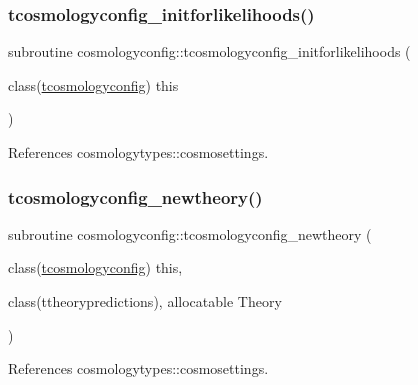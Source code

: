 \subsubsection{\texorpdfstring{tcosmologyconfig\+\_\+initforlikelihoods()}{tcosmologyconfig\_initforlikelihoods()}}
{\footnotesize\ttfamily subroutine cosmologyconfig\+::tcosmologyconfig\+\_\+initforlikelihoods (\begin{DoxyParamCaption}\item[{class(\mbox{\hyperlink{structcosmologyconfig_1_1tcosmologyconfig}{tcosmologyconfig}})}]{this }\end{DoxyParamCaption})\hspace{0.3cm}{\ttfamily [private]}}



References cosmologytypes\+::cosmosettings.

\mbox{\label{namespacecosmologyconfig_a06fe1484d890d220a81bc2f26abb6ee1}} 
\subsubsection{\texorpdfstring{tcosmologyconfig\+\_\+newtheory()}{tcosmologyconfig\_newtheory()}}
{\footnotesize\ttfamily subroutine cosmologyconfig\+::tcosmologyconfig\+\_\+newtheory (\begin{DoxyParamCaption}\item[{class(\mbox{\hyperlink{structcosmologyconfig_1_1tcosmologyconfig}{tcosmologyconfig}})}]{this,  }\item[{class(ttheorypredictions), allocatable}]{Theory }\end{DoxyParamCaption})\hspace{0.3cm}{\ttfamily [private]}}



References cosmologytypes\+::cosmosettings.

\mbox{\label{namespacecosmologyconfig_acdea2393465448c7d709df546d6d23cf}} 
